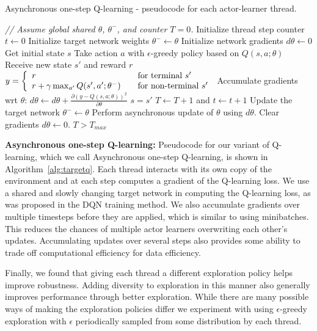\documentclass{article} \usepackage{times}
\begin{document}
\begin{algorithm}[t]
\caption{Asynchronous one-step Q-learning - pseudocode for each actor-learner thread.}
\begin{algorithmic}
\small
\State \emph{// Assume global shared $\theta$, $\theta^-$, and counter $T=0$.}
\State Initialize thread step counter $t\gets 0$
\State Initialize target network weights $\theta^- \gets \theta$
\State Initialize network gradients $d\theta \gets 0$
\State Get initial state $s$
\Repeat
\State Take action $a$ with $\epsilon$-greedy policy based on $Q(s,a;\theta)$
\State Receive new state $s'$ and reward $r$
\State $y =
    \left\{
    \begin{array}{l l}
      r  \quad & \text{for terminal } s'\\
      r + \gamma \max_{a'} Q(s', a'; \theta^-) \quad & \text{for non-terminal } s'
    \end{array} \right.$
\State Accumulate gradients wrt $\theta$: $d\theta \gets d\theta + \frac{\partial\left(y - Q(s,a;\theta)\right)^2}{\partial \theta}$
\State $s=s'$
\State $T \gets T + 1$ and $t \gets t + 1$
\State Update the target network $\theta^- \gets \theta$ 
\EndIf
{}
\State Perform asynchronous update of $\theta$ using $d\theta$.
\State Clear gradients $d\theta \gets 0$.
\EndIf
\Until $T > T_{max}$
\end{algorithmic}
\label{alg:targetq}
\end{algorithm}

\textbf{Asynchronous one-step Q-learning:}
Pseudocode for our variant of Q-learning, which we call Asynchronous one-step Q-learning, is shown in Algorithm~\ref{alg:targetq}.
Each thread interacts with its own copy of the environment and at each step computes a gradient of the Q-learning loss.
We use a shared and slowly changing target network in computing the Q-learning loss, as was proposed in the DQN training method.
We also accumulate gradients over multiple timesteps before they are applied, which is similar to using minibatches.
This reduces the chances of multiple actor learners overwriting each other's updates.
Accumulating updates over several steps also provides some ability to trade off computational efficiency for data efficiency.

Finally, we found that giving each thread a different exploration policy helps improve robustness.
Adding diversity to exploration in this manner also generally improves performance through better exploration.
While there are many possible ways of making the exploration policies differ we experiment with using $\epsilon$-greedy exploration with $\epsilon$ periodically sampled from some distribution by each thread.
\end{document}
